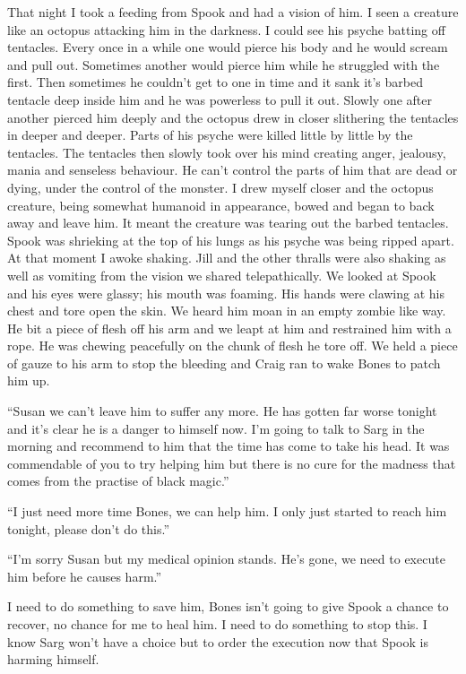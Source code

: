 That night I took a feeding from Spook and had a vision of him. I seen a creature like an octopus attacking him in the darkness. I could see his psyche batting off tentacles. Every once in a while one would pierce his body and he would scream and pull out. Sometimes another would pierce him while he struggled with the first. Then sometimes he couldn't get to one in time and it sank it's barbed tentacle deep inside him and he was powerless to pull it out. Slowly one after another pierced him deeply and the octopus drew in closer slithering the tentacles in deeper and deeper. Parts of his psyche were killed little by little by the tentacles. The tentacles then slowly took over his mind creating anger, jealousy, mania and senseless behaviour. He can't control the parts of him that are dead or dying, under the control of the monster. I drew myself closer and the octopus creature, being somewhat humanoid in appearance, bowed and began to back away and leave him. It meant the creature was tearing out the barbed tentacles. Spook was shrieking at the top of his lungs as his psyche was being ripped apart. At that moment I awoke shaking. Jill and the other thralls were also shaking as well as vomiting from the vision we shared telepathically. We looked at Spook and his eyes were glassy; his mouth was foaming. His hands were clawing at his chest and tore open the skin. We heard him moan in an empty zombie like way. He bit a piece of flesh off his arm and we leapt at him and restrained him with a rope. He was chewing peacefully on the chunk of flesh he tore off. We held a piece of gauze to his arm to stop the bleeding and Craig ran to wake Bones to patch him up.

``Susan we can't leave him to suffer any more. He has gotten far worse tonight and it's clear he is a danger to himself now. I'm going to talk to Sarg in the morning and recommend to him that the time has come to take his head. It was commendable of you to try helping him but there is no cure for the madness that comes from the practise of black magic.''

``I just need more time Bones, we can help him. I only just started to reach him tonight, please don't do this.''

``I'm sorry Susan but my medical opinion stands. He's gone, we need to execute him before he causes harm.''

I need to do something to save him, Bones isn't going to give Spook a chance to recover, no chance for me to heal him. I need to do something to stop this. I know Sarg won't have a choice but to order the execution now that Spook is harming himself.

